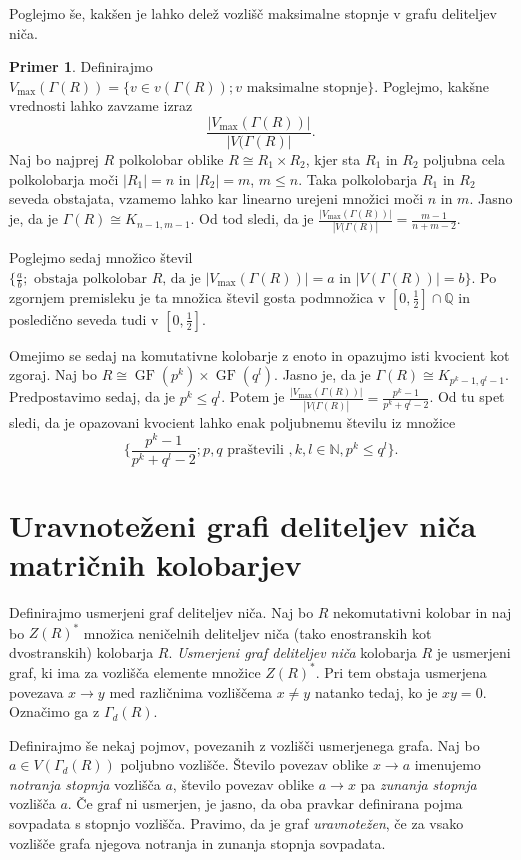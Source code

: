 \documentclass[a4paper, 12pt]{amsart}
\theoremstyle{definition} %
\newtheorem{primer}[definicija]{Primer}
\theoremstyle{plain} %
\newcommand{\N}{\mathbb N}
\newcommand{\Q}{\mathbb Q}
\DeclareMathOperator{\GF}{GF}
\begin{document}
Poglejmo še, kakšen je lahko delež vozlišč maksimalne stopnje v grafu deliteljev niča.
\begin{primer}
Definirajmo $V_{\max} (\Gamma(R)) = \{v\in v(\Gamma(R)); v \textrm{ maksimalne stopnje}\}$. Poglejmo, kakšne vrednosti lahko zavzame izraz 
$$
\frac{|V_{\max}(\Gamma(R))|}{|V(\Gamma(R)|}.
$$
Naj bo najprej $R$ polkolobar oblike $R \cong R_1 \times R_2$, kjer sta $R_1$ in $R_2$ poljubna cela polkolobarja moči $|R_1| = n$ in $|R_2| = m$, $m \le n$. Taka polkolobarja $R_1$ in $R_2$ seveda obstajata, vzamemo lahko kar linearno urejeni množici moči $n$ in $m$. Jasno je, da je $\Gamma(R) \cong K_{n-1,m-1}$. Od tod sledi, da je $\frac{|V_{\max}(\Gamma(R))|}{|V(\Gamma(R)|} = \frac{m-1}{n+m-2}$. 

Poglejmo sedaj množico števil $\{\frac{a}{b}; \textrm{ obstaja polkolobar } R \textrm{, da je } |V_{\max}(\Gamma(R))| = a \textrm{ in } |V(\Gamma(R))| = b \}$. Po zgornjem premisleku je ta množica števil gosta podmnožica v $[0, \frac{1}{2}]\cap\Q$ in posledično seveda tudi v $[0,\frac{1}{2}]$.

Omejimo se sedaj na komutativne kolobarje z enoto in opazujmo isti kvocient kot zgoraj. Naj bo $R\cong \GF(p^k) \times \GF(q^l)$. Jasno je, da je $\Gamma(R) \cong K_{p^k - 1, q^l -1}$. Predpostavimo sedaj, da je $p^k \le q^l$. Potem je $\frac{|V_{\max}(\Gamma(R))|}{|V(\Gamma(R)|} = \frac{p^k - 1}{p^k + q^l -2}$. Od tu spet sledi, da je opazovani kvocient lahko enak poljubnemu številu iz množice
$$
\Big\{\frac{p^k - 1}{p^k + q^l -2}; p,q \textrm{ praštevili }, k,l \in \N, p^k \le q^l\Big\}.
$$
\end{primer}

\section{Uravnoteženi grafi deliteljev niča matričnih kolobarjev}
Definirajmo usmerjeni graf deliteljev niča. Naj bo $R$ nekomutativni kolobar in naj bo  $Z(R)^*$ množica neničelnih deliteljev niča (tako enostranskih kot dvostranskih) kolobarja $R$. \emph{Usmerjeni graf deliteljev niča} kolobarja $R$ je usmerjeni graf, ki ima za vozlišča elemente množice $Z(R)^*$. Pri tem obstaja usmerjena povezava $x\rightarrow y$ med različnima vozliščema $x\neq y$ natanko tedaj, ko je $xy=0$. Označimo ga z $\Gamma_d(R)$. 

Definirajmo še nekaj pojmov, povezanih z vozlišči usmerjenega grafa. Naj bo $a\in V(\Gamma_d(R))$ poljubno vozlišče. Število povezav oblike $x\rightarrow a$ imenujemo \emph{notranja stopnja} vozlišča $a$, število povezav oblike $a\rightarrow x$ pa \emph{zunanja stopnja} vozlišča $a$. Če graf ni usmerjen, je jasno, da oba pravkar definirana pojma sovpadata s stopnjo vozlišča. Pravimo, da je graf \emph{uravnotežen}, če za vsako vozlišče grafa njegova notranja in zunanja stopnja sovpadata.
\end{document}
